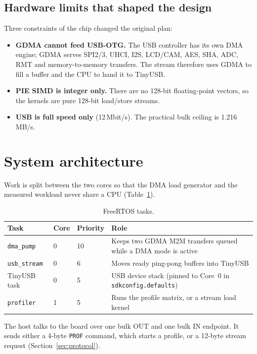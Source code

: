 \documentclass[11pt,a4paper]{article}
\begin{document}
\subsection{Hardware limits that shaped the design}
Three constraints of the chip changed the original plan:
\begin{itemize}
  \item \textbf{GDMA cannot feed USB-OTG.} The USB controller has its own DMA engine; GDMA serves
        SPI2/3, UHCI, I2S, LCD/CAM, AES, SHA, ADC, RMT and memory-to-memory transfers. The stream
        therefore uses GDMA to fill a buffer and the CPU to hand it to TinyUSB.
  \item \textbf{PIE SIMD is integer only.} There are no 128-bit floating-point vectors, so the
        kernels are pure 128-bit load/store streams.
  \item \textbf{USB is full speed only} (12\,Mbit/s). The practical bulk ceiling is 1.216\,MB/s.
\end{itemize}

\section{System architecture}
Work is split between the two cores so that the DMA load generator and the measured workload never
share a CPU (Table~\ref{tab:tasks}).

\begin{table}[h]
\centering
\begin{tabularx}{\linewidth}{@{}lllX@{}}
\toprule
Task & Core & Priority & Role \\
\midrule
\texttt{dma\_pump}   & 0 & 10 & Keeps two GDMA M2M transfers queued while a DMA mode is active \\
\texttt{usb\_stream} & 0 & 6  & Moves ready ping-pong buffers into TinyUSB \\
TinyUSB task         & 0 & 5  & USB device stack (pinned to Core~0 in \texttt{sdkconfig.defaults}) \\
\texttt{profiler}    & 1 & 5  & Runs the profile matrix, or a stream load kernel \\
\bottomrule
\end{tabularx}
\caption{FreeRTOS tasks.}
\label{tab:tasks}
\end{table}

\noindent The host talks to the board over one bulk OUT and one bulk IN endpoint. It sends either a
4-byte \texttt{PROF} command, which starts a profile, or a 12-byte stream request
(Section~\ref{sec:protocol}).
\end{document}
